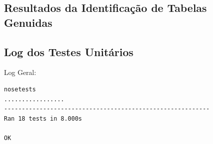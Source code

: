 \documentclass[12pt, a4paper]{article}
\begin{document}
\subsection{Resultados da Identificação de Tabelas Genuidas}
\label{ritg}

\subsection{Log dos Testes Unitários}
\label{testes}

Log Geral:
\begin{verbatim}
nosetests
.................
----------------------------------------------------------
Ran 18 tests in 8.000s

OK

\end{verbatim}
\end{document}
